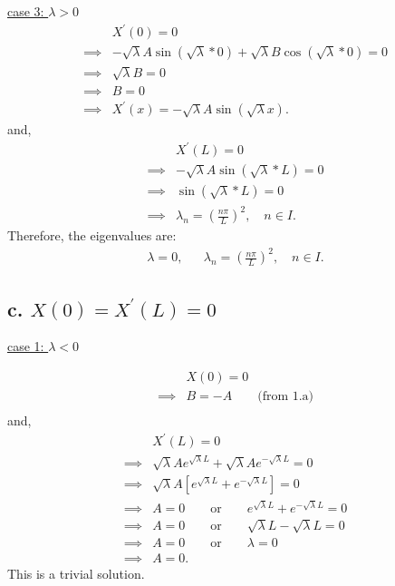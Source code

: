 \documentclass{article}
\begin{document}
\noindent
\underline{case 3: $\lambda > 0$}
\begin{align*}
  &X^{\prime}(0) = 0 \\
  \implies& -\sqrt{\lambda} A \sin(\sqrt{\lambda} * 0) + 
  \sqrt{\lambda} B\cos(\sqrt{\lambda} * 0) = 0 \\
  \implies& \sqrt{\lambda} B = 0 \\
  \implies& B = 0 \\
  \implies& X^{\prime}(x) = -\sqrt{\lambda} A \sin(\sqrt{\lambda} x).
\end{align*}
and,
\begin{align*}
  &X^{\prime}(L) = 0 \\
  \implies& -\sqrt{\lambda} A \sin(\sqrt{\lambda} * L) = 0 \\
  \implies& \sin(\sqrt{\lambda} * L) = 0 \\
  \implies& \lambda_n = (\frac{n\pi}{L})^2, \quad n \in I.
\end{align*}
Therefore, the eigenvalues are:
\begin{align*}
  \lambda = 0, && \lambda_n = (\frac{n\pi}{L})^2, \quad n \in I.
\end{align*}

\subsection*{c. \underline{$X(0) = X^{\prime}(L) = 0$}}

\underline{case 1: $\lambda < 0$}

\begin{align*}
  &X(0) = 0 \\
  \implies& B = -A \qquad \text{(from 1.a)} \\
\end{align*}
and,
\begin{align*}
  &X^{\prime}(L) = 0 \\
  \implies& \sqrt{\lambda} A e^{\sqrt{\lambda} L} + \sqrt{\lambda} A e^{-\sqrt{\lambda} L} = 0 \\
  \implies& \sqrt{\lambda} A [e^{\sqrt{\lambda} L} + e^{-\sqrt{\lambda} L}] = 0 \\
  \implies& A = 0 \qquad \text{or} \qquad e^{\sqrt{\lambda} L} + e^{-\sqrt{\lambda} L} = 0 \\
  \implies& A = 0 \qquad \text{or} \qquad \sqrt{\lambda} L -\sqrt{\lambda} L = 0 \\
  \implies& A = 0 \qquad \text{or} \qquad \lambda = 0 \\
  \implies& A = 0.
\end{align*}
This is a trivial solution.
\newline
\end{document}
